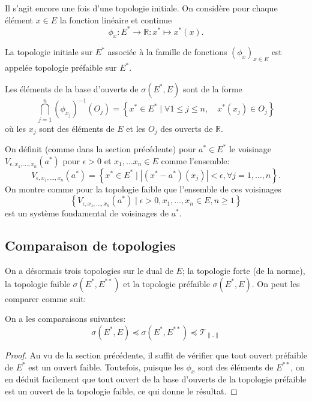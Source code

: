 Il s'agit encore une fois d'une topologie initiale. On considère pour
chaque élément $x\in E$ la fonction linéaire et continue
$$\phi_x: E^*\to\mathbb R: x^*\mapsto x^*(x).$$

\begin{df}
  La topologie initiale sur $E^*$ associée à la famille de fonctions
  $\left(\phi_x\right)_{x\in E}$ est appelée topologie préfaible sur $E^*$.
\end{df}

Les éléments de la base d'ouverts de $\sigma(E^*, E)$ sont
de la forme
\begin{equation*}
  \bigcap_{j=1}^n (\phi_{x_j})^{-1}(O_j) =
  \left\{ x^*\in E^*\mid \forall 1\leq j\leq n,\quad x^*(x_j)\in O_j\right\}
\end{equation*}
où les $x_j$ sont des éléments de $E$ et les $O_j$ des ouverts de $\mathbb R$.

On définit (comme dans la section précédente) pour $a^*\in E^*$ le voisinage
$V_{\epsilon, x_1, \ldots, x_n}(a^*)$ pour $\epsilon > 0$ et
$x_1, \ldots x_n\in E$ comme l'ensemble:
$$ V_{\epsilon, x_1, \ldots, x_n}(a^*) = \left\{
 x^*\in E^* \mid |(x^*-a^*)(x_j) | <\epsilon, \forall j = 1, \ldots, n\right\}.$$
On montre comme pour la topologie faible que l'ensemble de ces voisinages
$$\left\{V_{\epsilon, x_1, \ldots, x_n}(a^*)\mid
  \epsilon > 0, x_1, \ldots, x_n\in E, n\geq 1\right\}$$
est un système fondamental de voisinages de $a^*$.

\subsection{Comparaison de topologies}
On a désormais trois topologies sur le dual de $E$; la topologie forte
(de la norme), la topologie faible $\sigma(E^*, E^{**})$ et la topologie
préfaible $\sigma(E^*, E)$. On peut les comparer comme suit:
\begin{prop}
  On a les comparaisons suivantes:
  $$\sigma(E^*, E) \preceq \sigma(E^*, E^{**}) \preceq \mathcal{T}_{\|.\|}$$
\end{prop}
\begin{proof}
  Au vu de la section précédente, il suffit de vérifier que tout ouvert
  préfaible de $E^*$ est un ouvert faible. Toutefois, puisque
  les $\phi_x$ sont des éléments de $E^{**}$, on en déduit facilement
  que tout ouvert de la base d'ouverts de la topologie préfaible
  est un ouvert de la topologie faible, ce qui donne le résultat.
\end{proof}

